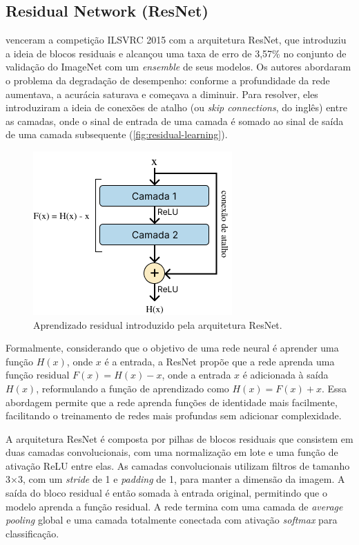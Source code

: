 \subsection{Residual Network (ResNet)}

 venceram a competição ILSVRC 2015 com a arquitetura ResNet, que introduziu a ideia de blocos residuais e alcançou uma taxa de erro de 3,57\% no conjunto de validação do ImageNet com um \textit{ensemble} de seus modelos. Os autores abordaram o problema da degradação de desempenho: conforme a profundidade da rede aumentava, a acurácia saturava e começava a diminuir. Para resolver, eles introduziram a ideia de conexões de atalho (ou \textit{skip connections}, do inglês) entre as camadas, onde o sinal de entrada de uma camada é somado ao sinal de saída de uma camada subsequente (\autoref{fig:residual-learning}).

\begin{figure}[!htbp]
    \centering
    \includegraphics[width=0.5\linewidth]{figs/residual-connection.png}
    \caption{Aprendizado residual introduzido pela arquitetura ResNet.}
    \label{fig:residual-learning}
\end{figure}

Formalmente, considerando que o objetivo de uma rede neural é aprender uma função \( H(x) \), onde \( x \) é a entrada, a ResNet propõe que a rede aprenda uma função residual \( F(x) = H(x) - x \), onde a entrada \( x \) é adicionada à saída \( H(x) \), reformulando a função de aprendizado como \( H(x) = F(x) + x \). Essa abordagem permite que a rede aprenda funções de identidade mais facilmente, facilitando o treinamento de redes mais profundas sem adicionar complexidade.

A arquitetura ResNet é composta por pilhas de blocos residuais que consistem em duas camadas convolucionais, com uma normalização em lote e uma função de ativação ReLU entre elas. As camadas convolucionais utilizam filtros de tamanho 3×3, com um \textit{stride} de 1 e \textit{padding} de 1, para manter a dimensão da imagem. A saída do bloco residual é então somada à entrada original, permitindo que o modelo aprenda a função residual. A rede termina com uma camada de \textit{average pooling} global e uma camada totalmente conectada com ativação \textit{softmax} para classificação.

